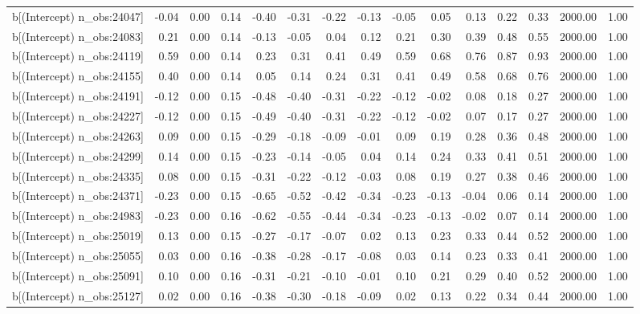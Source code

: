 \begin{table}[ht]
\begin{tabular}{rrrrrrrrrrrrrrr}
  b[(Intercept) n\_obs:24047] & -0.04 & 0.00 & 0.14 & -0.40 & -0.31 & -0.22 & -0.13 & -0.05 & 0.05 & 0.13 & 0.22 & 0.33 & 2000.00 & 1.00 \\ 
  b[(Intercept) n\_obs:24083] & 0.21 & 0.00 & 0.14 & -0.13 & -0.05 & 0.04 & 0.12 & 0.21 & 0.30 & 0.39 & 0.48 & 0.55 & 2000.00 & 1.00 \\ 
  b[(Intercept) n\_obs:24119] & 0.59 & 0.00 & 0.14 & 0.23 & 0.31 & 0.41 & 0.49 & 0.59 & 0.68 & 0.76 & 0.87 & 0.93 & 2000.00 & 1.00 \\ 
  b[(Intercept) n\_obs:24155] & 0.40 & 0.00 & 0.14 & 0.05 & 0.14 & 0.24 & 0.31 & 0.41 & 0.49 & 0.58 & 0.68 & 0.76 & 2000.00 & 1.00 \\ 
  b[(Intercept) n\_obs:24191] & -0.12 & 0.00 & 0.15 & -0.48 & -0.40 & -0.31 & -0.22 & -0.12 & -0.02 & 0.08 & 0.18 & 0.27 & 2000.00 & 1.00 \\ 
  b[(Intercept) n\_obs:24227] & -0.12 & 0.00 & 0.15 & -0.49 & -0.40 & -0.31 & -0.22 & -0.12 & -0.02 & 0.07 & 0.17 & 0.27 & 2000.00 & 1.00 \\ 
  b[(Intercept) n\_obs:24263] & 0.09 & 0.00 & 0.15 & -0.29 & -0.18 & -0.09 & -0.01 & 0.09 & 0.19 & 0.28 & 0.36 & 0.48 & 2000.00 & 1.00 \\ 
  b[(Intercept) n\_obs:24299] & 0.14 & 0.00 & 0.15 & -0.23 & -0.14 & -0.05 & 0.04 & 0.14 & 0.24 & 0.33 & 0.41 & 0.51 & 2000.00 & 1.00 \\ 
  b[(Intercept) n\_obs:24335] & 0.08 & 0.00 & 0.15 & -0.31 & -0.22 & -0.12 & -0.03 & 0.08 & 0.19 & 0.27 & 0.38 & 0.46 & 2000.00 & 1.00 \\ 
  b[(Intercept) n\_obs:24371] & -0.23 & 0.00 & 0.15 & -0.65 & -0.52 & -0.42 & -0.34 & -0.23 & -0.13 & -0.04 & 0.06 & 0.14 & 2000.00 & 1.00 \\ 
  b[(Intercept) n\_obs:24983] & -0.23 & 0.00 & 0.16 & -0.62 & -0.55 & -0.44 & -0.34 & -0.23 & -0.13 & -0.02 & 0.07 & 0.14 & 2000.00 & 1.00 \\ 
  b[(Intercept) n\_obs:25019] & 0.13 & 0.00 & 0.15 & -0.27 & -0.17 & -0.07 & 0.02 & 0.13 & 0.23 & 0.33 & 0.44 & 0.52 & 2000.00 & 1.00 \\ 
  b[(Intercept) n\_obs:25055] & 0.03 & 0.00 & 0.16 & -0.38 & -0.28 & -0.17 & -0.08 & 0.03 & 0.14 & 0.23 & 0.33 & 0.41 & 2000.00 & 1.00 \\ 
  b[(Intercept) n\_obs:25091] & 0.10 & 0.00 & 0.16 & -0.31 & -0.21 & -0.10 & -0.01 & 0.10 & 0.21 & 0.29 & 0.40 & 0.52 & 2000.00 & 1.00 \\ 
  b[(Intercept) n\_obs:25127] & 0.02 & 0.00 & 0.16 & -0.38 & -0.30 & -0.18 & -0.09 & 0.02 & 0.13 & 0.22 & 0.34 & 0.44 & 2000.00 & 1.00 \\ 

\end{tabular}
\end{table}
